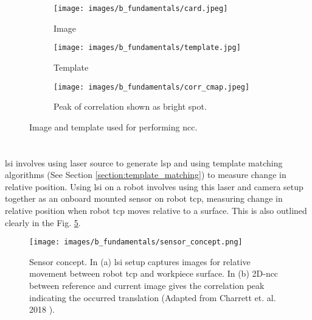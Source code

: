     \begin{figure}[h]
        \begin{subfigure}{0.3\textwidth}
            \centering
            \texttt{[image: images/b\_fundamentals/card.jpeg]}
            \caption{Image}
            \label{subfig:card.jpg}
        \end{subfigure}
        \begin{subfigure}{0.3\textwidth}
            \centering
            \texttt{[image: images/b\_fundamentals/template.jpg]}
            \caption{Template}
            \label{subfig:template.jpg}
        \end{subfigure}
        \begin{subfigure}{0.3\textwidth}
            \centering
            \texttt{[image: images/b\_fundamentals/corr\_cmap.jpeg]}
            \caption{Peak of correlation shown as bright spot.}
            \label{fig:corr_cmap.png}
        \end{subfigure}
        \caption{Image and template used for performing \gls{ncc}. \cite{img_card}}
        \label{fig:ncc_example}
    \end{figure}


    \section{}\label{section:lsi}
    \gls{lsi} involves using laser source to generate \gls{lsp} and using template matching algorithms (See Section \ref{section:template_matching}) to measure change in relative position. Using \gls{lsi} on a robot involves using this laser and camera setup together as an onboard mounted sensor on robot \gls{tcp}, measuring change in relative position when robot \gls{tcp} moves relative to a surface. This is also outlined clearly in the Fig. \ref{fig:sensor_concept.png}. 
    
    \begin{figure}
        \centering
        \texttt{[image: images/b\_fundamentals/sensor\_concept.png]}
        \caption{Sensor concept. In (a) \gls{lsi} setup captures images for relative movement between robot \gls{tcp} and workpiece surface. In (b) 2D-\gls{ncc} between reference and current image gives the correlation peak indicating the occurred translation (Adapted from Charrett et. al. 2018 \cite{charrett_2018}).}
        \label{fig:sensor_concept.png}
    \end{figure}

    \clearpage